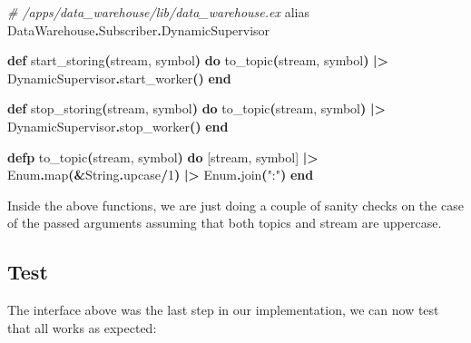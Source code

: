 \documentclass[
  oneside]{book}
\newenvironment{Shaded}{\begin{snugshade}}{\end{snugshade}}
\newcommand{\CommentTok}[1]{\textcolor[rgb]{0.56,0.35,0.01}{\textit{#1}}}
\newcommand{\ConstantTok}[1]{\textcolor[rgb]{0.56,0.35,0.01}{#1}}
\newcommand{\DecValTok}[1]{\textcolor[rgb]{0.00,0.00,0.81}{#1}}
\newcommand{\FunctionTok}[1]{\textcolor[rgb]{0.13,0.29,0.53}{\textbf{#1}}}
\newcommand{\ImportTok}[1]{#1}
\newcommand{\KeywordTok}[1]{\textcolor[rgb]{0.13,0.29,0.53}{\textbf{#1}}}
\newcommand{\NormalTok}[1]{#1}
\newcommand{\OperatorTok}[1]{\textcolor[rgb]{0.81,0.36,0.00}{\textbf{#1}}}
\newcommand{\OtherTok}[1]{\textcolor[rgb]{0.56,0.35,0.01}{#1}}
\newcommand{\StringTok}[1]{\textcolor[rgb]{0.31,0.60,0.02}{#1}}
\begin{document}
\begin{Shaded}
\begin{Highlighting}[]
  \CommentTok{\# /apps/data\_warehouse/lib/data\_warehouse.ex}
  \ImportTok{alias} \ConstantTok{DataWarehouse}\OperatorTok{.}\ConstantTok{Subscriber}\OperatorTok{.}\ConstantTok{DynamicSupervisor}

  \KeywordTok{def}\NormalTok{ start\_storing}\FunctionTok{(}\NormalTok{stream, symbol}\FunctionTok{)} \KeywordTok{do}
\NormalTok{    to\_topic}\FunctionTok{(}\NormalTok{stream, symbol}\FunctionTok{)}
    \OperatorTok{|\textgreater{}} \ConstantTok{DynamicSupervisor}\OperatorTok{.}\NormalTok{start\_worker}\FunctionTok{()}
  \KeywordTok{end}

  \KeywordTok{def}\NormalTok{ stop\_storing}\FunctionTok{(}\NormalTok{stream, symbol}\FunctionTok{)} \KeywordTok{do}
\NormalTok{    to\_topic}\FunctionTok{(}\NormalTok{stream, symbol}\FunctionTok{)}
    \OperatorTok{|\textgreater{}} \ConstantTok{DynamicSupervisor}\OperatorTok{.}\NormalTok{stop\_worker}\FunctionTok{()}
  \KeywordTok{end}

  \KeywordTok{defp}\NormalTok{ to\_topic}\FunctionTok{(}\NormalTok{stream, symbol}\FunctionTok{)} \KeywordTok{do}
    \OtherTok{[}\NormalTok{stream, symbol}\OtherTok{]}
    \OperatorTok{|\textgreater{}} \ConstantTok{Enum}\OperatorTok{.}\NormalTok{map}\FunctionTok{(}\OperatorTok{\&}\ConstantTok{String}\OperatorTok{.}\NormalTok{upcase}\OperatorTok{/}\DecValTok{1}\FunctionTok{)}
    \OperatorTok{|\textgreater{}} \ConstantTok{Enum}\OperatorTok{.}\NormalTok{join}\FunctionTok{(}\StringTok{":"}\FunctionTok{)}
  \KeywordTok{end}
\end{Highlighting}
\end{Shaded}

Inside the above functions, we are just doing a couple of sanity checks on the case of the passed arguments assuming that both topics and stream are uppercase.

\subsection{Test}\label{test}

The interface above was the last step in our implementation, we can now test that all works as expected:
\end{document}
